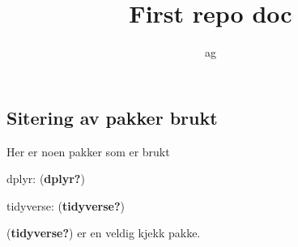 \documentclass[
  letterpaper,
  DIV=11,
  numbers=noendperiod]{scrartcl}
\title{First repo doc}
\author{ag}
\date{}
\begin{document}
\maketitle


\subsection{Sitering av pakker brukt}\label{sitering-av-pakker-brukt}

Her er noen pakker som er brukt

dplyr: (\textbf{dplyr?})

tidyverse: (\textbf{tidyverse?})

(\textbf{tidyverse?}) er en veldig kjekk pakke.
\end{document}

